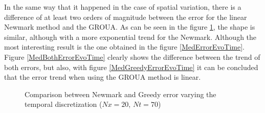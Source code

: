 \documentclass{ws-m3as}
\begin{document}
In the same way that it happened in the case of spatial variation, there is a difference of at least two orders of magnitude between the error for the linear Newmark method and the GROUA. As can be seen in the figure \ref{CompPropTime}, the shape is similar, although with a more exponential trend for the Newmark.
Although the most interesting result is the one obtained in the figure \ref{MedErrorEvoTime}. Figure \ref{MedBothErrorEvoTime} clearly shows the difference between the trend of both errors, but also, with figure \ref{MedGreedyErrorEvoTime} it can be concluded that the error trend when using the GROUA method is linear.



\begin{figure}
 \centering
  \caption{Comparison between Newmark and Greedy error varying the temporal discretization ($Nx=20$, $Nt=70$)}
 \label{CompPropTime}
\end{figure}
\end{document}
